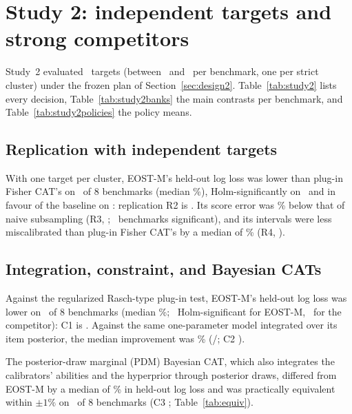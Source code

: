 \section{Study 2: independent targets and strong competitors}
\label{sec:study2}

Study~2 evaluated \STwoTargetsTotal\ targets (between \STwoTargetsMin\ and
\STwoTargetsMax\ per benchmark, one per strict cluster) under the frozen plan of
Section~\ref{sec:design2}. Table~\ref{tab:study2} lists every decision,
Table~\ref{tab:study2banks} the main contrasts per benchmark, and
Table~\ref{tab:study2policies} the policy means. \StudyTwoSummary


\subsection{Replication with independent targets}
With one target per cluster, EOST-M's held-out log loss was lower than plug-in Fisher
CAT's on \STwoRTwoPos\ of 8 benchmarks (median \STwoRTwoMed\%), Holm-significantly on
\STwoRTwoFav\ and in favour of the baseline on \STwoRTwoBase: replication R2 is
\STwoRTwoVerdict. Its score error was \STwoRThreeMed\% below that of naive subsampling
(R3, \STwoRThreeVerdict; \STwoRThreeFav\ benchmarks significant), and its intervals were
less miscalibrated than plug-in Fisher CAT's by a median of \STwoRFourMed\% (R4,
\STwoRFourVerdict). \StudyTwoReplicationText


\subsection{Integration, constraint, and Bayesian CATs}\label{sec:s2fb}
Against the regularized Rasch-type plug-in test, EOST-M's held-out log loss was lower on
\STwoCOnePos\ of 8 benchmarks (median \STwoCOneMed\%; \STwoCOneFav\ Holm-significant for
EOST-M, \STwoCOneBase\ for the competitor): C1 is \STwoCOneVerdict. Against the same
one-parameter model integrated over its item posterior, the median improvement was
\STwoCTwoMed\% (\STwoCTwoFav/\STwoCTwoBase; C2 \STwoCTwoVerdict). \StudyTwoRaschText
\par
The posterior-draw marginal (PDM) Bayesian CAT, which also integrates the calibrators'
abilities and the hyperprior through posterior draws, differed from EOST-M by a median of \STwoCThreeMed\% in held-out log loss and
was practically equivalent within $\pm1\%$ on \STwoCThreeEq\ of 8 benchmarks (C3
\STwoCThreeVerdict; Table~\ref{tab:equiv}). \StudyTwoFBText

